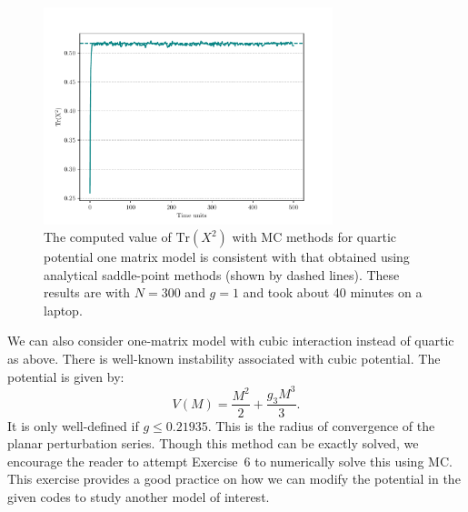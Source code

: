 \documentclass[letter,11pt]{article}
\begin{document}
\begin{figure}[htbp] 
	\centering 
	\includegraphics[width=0.75\textwidth]{figs/mm_plot.pdf}
	\caption{\label{fig:1MM_res}The computed value of $\mbox{Tr}(X^2)$ with MC methods for quartic potential
		one matrix model is consistent with that obtained using analytical saddle-point methods (shown by dashed lines). 
		These results are with $N = 300$ and $g = 1$ and took about 40 minutes on a laptop.}
\end{figure}
We can also consider one-matrix model with cubic interaction instead of quartic as above. 
There is well-known instability associated with cubic potential. The potential is given by:
\begin{equation}
	V(M) = \frac{M^2}{2} + \frac{g_{3}M^3}{3}.  
\end{equation}
It is only well-defined if $g \le 0.21935$. This is the radius of convergence of the planar perturbation series. 
Though this method can be exactly solved, we encourage the reader to attempt Exercise~6 to numerically solve this using MC. This exercise provides a good practice on how we can modify the potential in the given codes to study another model of interest. 
\end{document}
